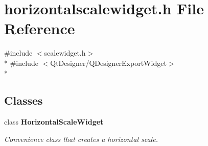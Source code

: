 \section{horizontalscalewidget.\+h File Reference}
\label{bk3_2horizontalscalewidget_8h}
{\ttfamily \#include $<$scalewidget.\+h$>$}\\*
{\ttfamily \#include $<$Qt\+Designer/\+Q\+Designer\+Export\+Widget$>$}\\*
\subsection*{Classes}
\begin{DoxyCompactItemize}
\item 
class {\bf Horizontal\+Scale\+Widget}
\begin{DoxyCompactList}\small\item\em Convenience class that creates a horizontal scale. \end{DoxyCompactList}\end{DoxyCompactItemize}
